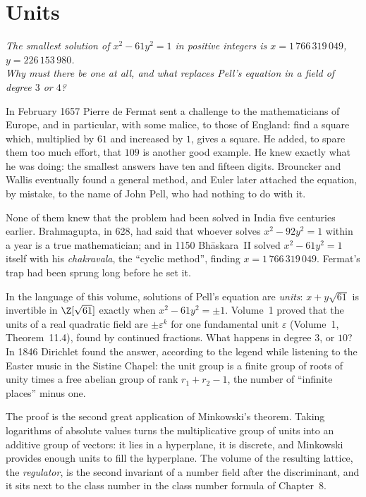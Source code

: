 \chapter{Units}
\begin{center}\itshape
The smallest solution of $x^2-61y^2=1$ in positive integers is $x=1\,766\,319\,049$, $y=226\,153\,980$.\\
Why must there be one at all, and what replaces Pell's equation in a field of degree $3$ or $4$?
\end{center}

In February 1657 Pierre de Fermat sent a challenge to the mathematicians of Europe, and in particular, with some malice,
to those of England: find a square which, multiplied by $61$ and increased by $1$, gives a square. He added, to spare
them too much effort, that $109$ is another good example. He knew exactly what he was doing: the smallest answers have
ten and fifteen digits. Brouncker and Wallis eventually found a general method, and Euler later attached the equation,
by mistake, to the name of John Pell, who had nothing to do with it.

None of them knew that the problem had been solved in India five centuries earlier. Brahmagupta, in 628, had said that
whoever solves $x^2-92y^2=1$ within a year is a true mathematician; and in 1150 Bh\=askara~II solved $x^2-61y^2=1$
itself with his \emph{chakravala}, the ``cyclic method'', finding $x=1\,766\,319\,049$. Fermat's trap had been sprung long
before he set it.

In the language of this volume, solutions of Pell's equation are \emph{units}: $x+y\sqrt{61}$ is invertible in $\Z[\sqrt{61}]$
exactly when $x^2-61y^2=\pm1$. Volume~1 proved that the units of a real quadratic field are $\pm\varepsilon^k$ for one
fundamental unit $\varepsilon$ (Volume~1, Theorem~11.4), found by continued fractions. What happens in degree $3$, or $10$?
In 1846 Dirichlet found the answer, according to the legend while listening to the Easter music in the Sistine Chapel: the
unit group is a finite group of roots of unity times a free abelian group of rank $r_1+r_2-1$, the number of
``infinite places'' minus one.

The proof is the second great application of Minkowski's theorem. Taking logarithms of absolute values turns the
multiplicative group of units into an additive group of vectors: it lies in a hyperplane, it is discrete, and Minkowski
provides enough units to fill the hyperplane. The volume of the resulting lattice, the \emph{regulator}, is the second
invariant of a number field after the discriminant, and it sits next to the class number in the class number formula of
Chapter~8.

